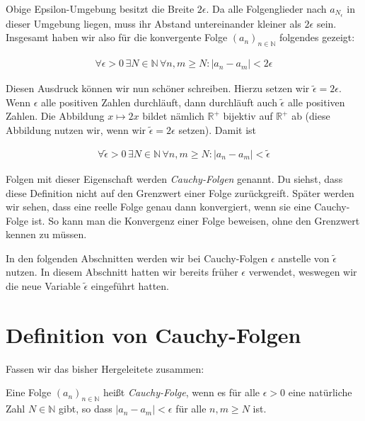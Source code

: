 \documentclass[fontsize=9pt,
               parskip=half-,
               DIV=14,
               listof=chapterentry,
               tocflat]{scrbook}
\begin{document}
Obige Epsilon-Umgebung besitzt die Breite $2\epsilon $. Da alle Folgenglieder nach $a_{N_{\epsilon }}$ in dieser Umgebung liegen, muss ihr Abstand untereinander kleiner als $2\epsilon $ sein. Insgesamt haben wir also für die konvergente Folge $(a_{n})_{n\in \mathbb {N} }$ folgendes gezeigt:

\begin{align*}
\forall \epsilon >0\,\exists N\in \mathbb {N} \,\forall n,m\geq N:|a_{n}-a_{m}|<2\epsilon 
\end{align*}

Diesen Ausdruck können wir nun schöner schreiben. Hierzu setzen wir ${\tilde {\epsilon }}=2\epsilon $. Wenn $\epsilon $ alle positiven Zahlen durchläuft, dann durchläuft auch ${\tilde {\epsilon }}$ alle positiven Zahlen. Die Abbildung $x\mapsto 2x$ bildet nämlich $\mathbb {R} ^{+}$ bijektiv auf $\mathbb {R} ^{+}$ ab (diese Abbildung nutzen wir, wenn wir ${\tilde {\epsilon }}=2\epsilon $ setzen). Damit ist

\begin{align*}
\forall {\tilde {\epsilon }}>0\,\exists N\in \mathbb {N} \,\forall n,m\geq N:|a_{n}-a_{m}|<{\tilde {\epsilon }}
\end{align*}

Folgen mit dieser Eigenschaft werden \emph{Cauchy-Folgen} genannt. Du siehst, dass diese Definition nicht auf den Grenzwert einer Folge zurückgreift. Später werden wir sehen, dass eine reelle Folge genau dann konvergiert, wenn sie eine Cauchy-Folge ist. So kann man die Konvergenz einer Folge beweisen, ohne den Grenzwert kennen zu müssen.

\begin{hint*}
In den folgenden Abschnitten werden wir bei Cauchy-Folgen $\epsilon $ anstelle von ${\tilde {\epsilon }}$ nutzen. In diesem Abschnitt hatten wir bereits früher $\epsilon $ verwendet, weswegen wir die neue Variable ${\tilde {\epsilon }}$ eingeführt hatten.

\end{hint*}

\section{Definition von Cauchy-Folgen}

Fassen wir das bisher Hergeleitete zusammen:

\begin{definition*}
Eine Folge $(a_{n})_{n\in \mathbb {N} }$ heißt \emph{Cauchy-Folge}, wenn es für alle $\epsilon >0$ eine natürliche Zahl $N\in \mathbb {N} $ gibt, so dass $|a_{n}-a_{m}|<\epsilon $ für alle $n,m\geq N$ ist.

\end{definition*}
\end{document}

